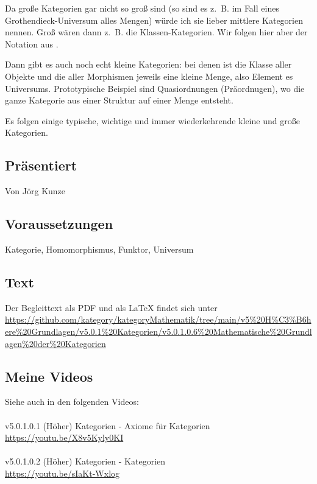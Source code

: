 \documentclass[a4paper]{amsart}
\theoremstyle{definition}
\newcommand{\zb}{z.~B. }
\begin{document}
Da große Kategorien gar nicht so groß sind (so sind es \zb im Fall eines Grothendieck-Universum alles Mengen) würde ich sie lieber mittlere Kategorien nennen. Groß wären dann \zb die Klassen-Kategorien. Wir folgen hier aber der Notation aus \cite{MacLane}.

Dann gibt es auch noch echt kleine Kategorien: bei denen ist die Klasse aller Objekte und die aller Morphismen jeweils eine kleine Menge, also Element es Universums. Prototypische Beispiel sind Quasiordnungen (Präordnugen), wo die ganze Kategorie aus einer Struktur auf einer Menge entsteht.

Es folgen einige typische, wichtige und immer wiederkehrende kleine und große Kategorien.

\subsection*{Präsentiert}
Von Jörg Kunze

\subsection*{Voraussetzungen}
Kategorie, Homomorphismus, Funktor, Universum

\subsection*{Text}
Der Begleittext als PDF und als LaTeX findet sich unter
{\tiny
   \url{https://github.com/kategory/kategoryMathematik/tree/main/v5%20H%C3%B6here%20Grundlagen/v5.0.1%20Kategorien/v5.0.1.0.6%20Mathematische%20Grundlagen%20der%20Kategorien}
}

\subsection*{Meine Videos}
Siehe auch in den folgenden Videos:\\
\\
v5.0.1.0.1 (Höher) Kategorien - Axiome für Kategorien\\
\url{https://youtu.be/X8v5Kyly0KI}\\
\\
v5.0.1.0.2 (Höher) Kategorien - Kategorien\\
\url{https://youtu.be/sIaKt-Wxlog}\\
\end{document}
